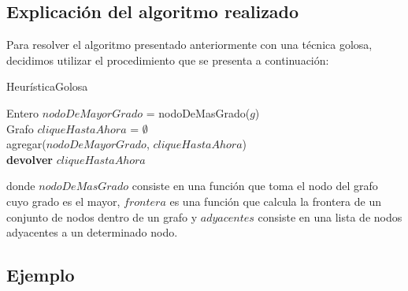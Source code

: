 \subsection{Explicación del algoritmo realizado}
Para resolver el algoritmo presentado anteriormente con una técnica golosa, decidimos utilizar el procedimiento que se presenta a continuación:\newline
\newline
\begin{algorithm}[H]
    \SetAlgoLined
    \caption{HeurísticaGolosa}
	Entero $nodoDeMayorGrado$ = nodoDeMasGrado($g$)\\
	Grafo $cliqueHastaAhora$ = $\emptyset$\\
	agregar($nodoDeMayorGrado$, $cliqueHastaAhora$)\\
\textbf{devolver} $cliqueHastaAhora$
\end{algorithm}

donde $nodoDeMasGrado$ consiste en una función que toma el nodo del grafo cuyo grado es el mayor, $frontera$ es una función que calcula la frontera de un conjunto de nodos dentro de un grafo y $adyacentes$ consiste en una lista de nodos adyacentes a un determinado nodo.\newline

\subsection{Ejemplo}


